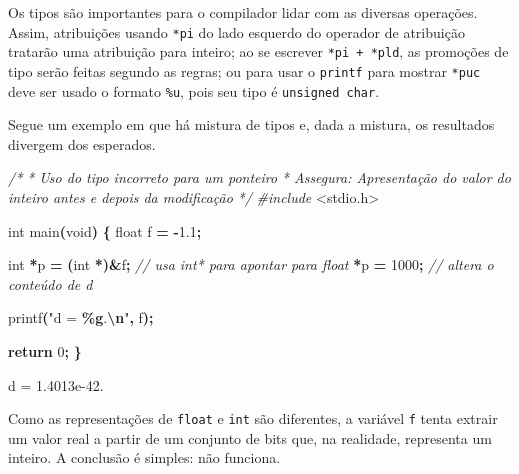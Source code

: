 \documentclass[
  11pt,
  a4paper,
]{scrbook}
\newenvironment{Shaded}{\begin{snugshade}}{\end{snugshade}}
\newcommand{\CommentTok}[1]{\textcolor[rgb]{0.56,0.35,0.01}{\textit{#1}}}
\newcommand{\ControlFlowTok}[1]{\textcolor[rgb]{0.13,0.29,0.53}{\textbf{#1}}}
\newcommand{\DataTypeTok}[1]{\textcolor[rgb]{0.13,0.29,0.53}{#1}}
\newcommand{\DecValTok}[1]{\textcolor[rgb]{0.00,0.00,0.81}{#1}}
\newcommand{\FloatTok}[1]{\textcolor[rgb]{0.00,0.00,0.81}{#1}}
\newcommand{\ImportTok}[1]{#1}
\newcommand{\NormalTok}[1]{#1}
\newcommand{\OperatorTok}[1]{\textcolor[rgb]{0.81,0.36,0.00}{\textbf{#1}}}
\newcommand{\PreprocessorTok}[1]{\textcolor[rgb]{0.56,0.35,0.01}{\textit{#1}}}
\newcommand{\SpecialCharTok}[1]{\textcolor[rgb]{0.81,0.36,0.00}{\textbf{#1}}}
\newcommand{\StringTok}[1]{\textcolor[rgb]{0.31,0.60,0.02}{#1}}
\begin{document}
Os tipos são importantes para o compilador lidar com as diversas
operações. Assim, atribuições usando \texttt{*pi} do lado esquerdo do
operador de atribuição tratarão uma atribuição para inteiro; ao se
escrever \texttt{*pi\ +\ *pld}, as promoções de tipo serão feitas
segundo as regras; ou para usar o \texttt{printf} para mostrar
\texttt{*puc} deve ser usado o formato \texttt{\%u}, pois seu tipo é
\texttt{unsigned\ char}.

Segue um exemplo em que há mistura de tipos e, dada a mistura, os
resultados divergem dos esperados.

\begin{Shaded}
\begin{Highlighting}[]
\CommentTok{/*}
\CommentTok{ * Uso do tipo incorreto para um ponteiro}
\CommentTok{ * Assegura: Apresentação do valor do inteiro antes e depois da modificação}
\CommentTok{ */}
\PreprocessorTok{\#include }\ImportTok{\textless{}stdio.h\textgreater{}}

\DataTypeTok{int}\NormalTok{ main}\OperatorTok{(}\DataTypeTok{void}\OperatorTok{)} \OperatorTok{\{}
    \DataTypeTok{float}\NormalTok{ f }\OperatorTok{=} \OperatorTok{{-}}\FloatTok{1.1}\OperatorTok{;}

    \DataTypeTok{int} \OperatorTok{*}\NormalTok{p }\OperatorTok{=} \OperatorTok{(}\DataTypeTok{int} \OperatorTok{*)\&}\NormalTok{f}\OperatorTok{;}  \CommentTok{// usa int* para apontar para float}
    \OperatorTok{*}\NormalTok{p }\OperatorTok{=} \DecValTok{1000}\OperatorTok{;}  \CommentTok{// altera o conteúdo de d}

\NormalTok{    printf}\OperatorTok{(}\StringTok{"d = }\SpecialCharTok{\%g}\StringTok{.}\SpecialCharTok{\textbackslash{}n}\StringTok{"}\OperatorTok{,}\NormalTok{ f}\OperatorTok{);}

    \ControlFlowTok{return} \DecValTok{0}\OperatorTok{;}
\OperatorTok{\}}
\end{Highlighting}
\end{Shaded}

\begin{Shaded}
\begin{Highlighting}[]
\NormalTok{d = 1.4013e{-}42.}
\end{Highlighting}
\end{Shaded}

Como as representações de \texttt{float} e \texttt{int} são diferentes,
a variável \texttt{f} tenta extrair um valor real a partir de um
conjunto de bits que, na realidade, representa um inteiro. A conclusão é
simples: não funciona.
\end{document}
